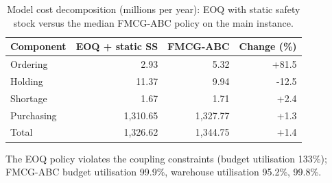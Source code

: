 \begin{table}[!t]
\centering
\footnotesize
\caption{Model cost decomposition (millions per year): EOQ with static safety stock versus the median FMCG-ABC policy on the main instance.}\label{tab:decomp}
\begin{tabular}{lrrr}
\toprule
Component & EOQ + static SS & FMCG-ABC & Change (\%) \\
\midrule
Ordering & 2.93 & 5.32 & +81.5 \\
Holding & 11.37 & 9.94 & -12.5 \\
Shortage & 1.67 & 1.71 & +2.4 \\
Purchasing & 1,310.65 & 1,327.77 & +1.3 \\
Total & 1,326.62 & 1,344.75 & +1.4 \\
\bottomrule
\end{tabular}
\par\smallskip\parbox{0.95\linewidth}{\scriptsize The EOQ policy violates the coupling constraints (budget utilisation 133\%); FMCG-ABC budget utilisation 99.9\%, warehouse utilisation 95.2\%, 99.8\%.}
\end{table}
